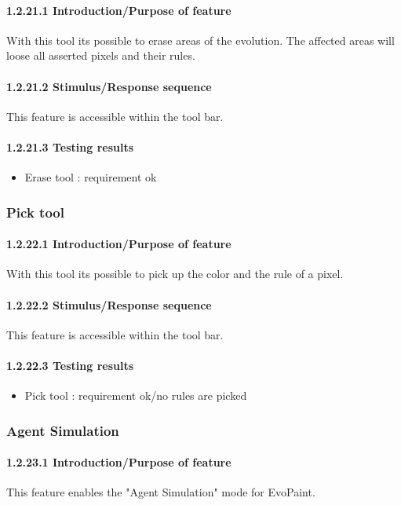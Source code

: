 \documentclass[titlepage,12pt]{scrartcl}
\begin{document}
\paragraph{1.2.21.1 Introduction/Purpose of feature}
With this tool its possible to erase areas of the evolution. The affected areas will loose all asserted pixels and their rules. 
\paragraph{1.2.21.2 Stimulus/Response sequence}
This feature is accessible within the tool bar. 
\paragraph{1.2.21.3 Testing results}
\begin{itemize}
	\item Erase tool 	: requirement ok
\end{itemize}

\subsubsection{Pick tool}
\paragraph{1.2.22.1 Introduction/Purpose of feature}
With this tool its possible to pick up the color and the rule of a pixel. 
\paragraph{1.2.22.2 Stimulus/Response sequence}
This feature is accessible within the tool bar. 
\paragraph{1.2.22.3 Testing results}
\begin{itemize}
	\item Pick tool 	: requirement ok/no rules are picked
\end{itemize}


\subsubsection{Agent Simulation}
\paragraph{1.2.23.1 Introduction/Purpose of feature}
This feature enables the "Agent Simulation" mode for EvoPaint. 
\end{document}
